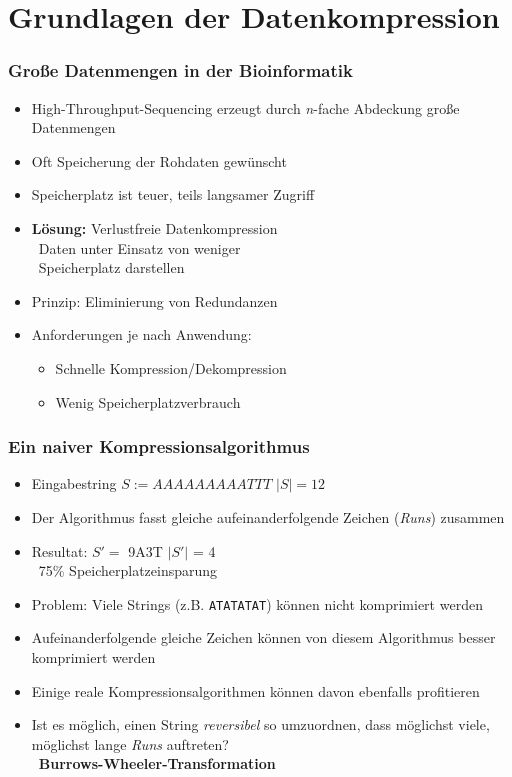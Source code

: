 \documentclass[14pt,xcolor=dvipsnames,pdftex]{beamer}
\begin{document}
\section{Grundlagen der Datenkompression}
\begin{frame}[allowframebreaks]
\frametitle{Große Datenmengen in der Bioinformatik}
  \begin{itemize}
   \item High-Throughput-Sequencing erzeugt durch \textit{n}-fache Abdeckung große Datenmengen
   \item Oft Speicherung der Rohdaten gewünscht
   \item Speicherplatz ist teuer, teils langsamer Zugriff
\end{itemize}
\framebreak
\begin{itemize}
 \item \textbf{Lösung:} Verlustfreie Datenkompression\\
 \textrightarrow\ Daten unter Einsatz von weniger\\
 \quad\ Speicherplatz darstellen
 \item Prinzip: Eliminierung von Redundanzen
 \item Anforderungen je nach Anwendung:
 \begin{itemize}
  \item Schnelle Kompression/Dekompression
  \item Wenig Speicherplatzverbrauch
 \end{itemize}
\end{itemize}
\end{frame}
\begin{frame}[allowframebreaks]
\frametitle{Ein naiver Kompressionsalgorithmus}
\begin{itemize}
 \item Eingabestring $S := AAAAAAAAATTT$ \textrightarrow $|S| = 12$
 \item Der 	Algorithmus fasst gleiche aufeinanderfolgende Zeichen (\textit{Runs}) zusammen
 \item Resultat: $S' = $ 9A3T \textrightarrow $|S'|$ = 4\\	\textrightarrow\ 75\% Speicherplatzeinsparung
 \item Problem: Viele Strings (z.B. \texttt{ATATATAT}) können nicht komprimiert werden
\end{itemize}
\framebreak
\begin{itemize}
 \item Aufeinanderfolgende gleiche Zeichen können von diesem Algorithmus besser komprimiert werden
 \item Einige reale Kompressionsalgorithmen können davon ebenfalls profitieren
 \item Ist es möglich, einen String \textit{reversibel} so umzuordnen, dass möglichst viele, möglichst lange \textit{Runs} auftreten?\\
 \textrightarrow\ \textbf{Burrows-Wheeler-Transformation}
\end{itemize}
\end{frame}
\end{document}

